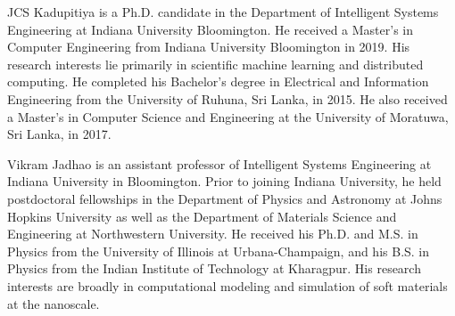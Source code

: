 

\begin{IEEEbiography}
{JCS Kadupitiya} is a Ph.D. candidate in the Department of Intelligent Systems Engineering at Indiana University Bloomington. He received a Master's in Computer Engineering from Indiana University Bloomington in 2019.  His research interests lie primarily in scientific machine learning and distributed computing. He completed his Bachelor’s degree in Electrical and Information Engineering from the University of Ruhuna, Sri Lanka, in 2015. He also received a Master's in Computer Science and Engineering at the University of Moratuwa, Sri Lanka, in 2017.
\end{IEEEbiography}


\begin{IEEEbiography}
 {Vikram Jadhao} is an assistant professor of Intelligent Systems Engineering at Indiana University in Bloomington. Prior to joining Indiana University, he held postdoctoral fellowships in the Department of Physics and Astronomy at Johns Hopkins University as well as the Department of Materials Science and Engineering at Northwestern University. He received his Ph.D. and M.S. in Physics from the University of Illinois at Urbana-Champaign, and his B.S. in Physics from the Indian Institute of Technology at Kharagpur. His research interests are broadly in computational modeling and simulation of soft materials at the nanoscale. 
\end{IEEEbiography}



